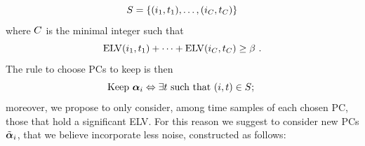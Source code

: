 \begin{equation}
S = \{(i_1, t_1), \dots , (i_{C},t_{C})\} 
\end{equation}
where $C$ is the minimal integer such that
\begin{equation}
\mathrm{ELV}(i_1,t_1)+\dots +  \mathrm{ELV}(i_{C},t_{C})\geq \beta \mbox{ .}
\end{equation}
The rule to choose PCs to keep is then
\begin{equation}
\mbox{Keep } \boldsymbol\alpha_i \Leftrightarrow \exists t \mbox{ such that } (i,t)\in S \mbox{; }
\end{equation}
moreover, we propose to only consider, among time samples of each chosen PC, those that hold a significant ELV. For this reason we suggest to consider new PCs $\tilde{\boldsymbol\alpha}_i$, that we believe incorporate less noise, constructed as follows:

